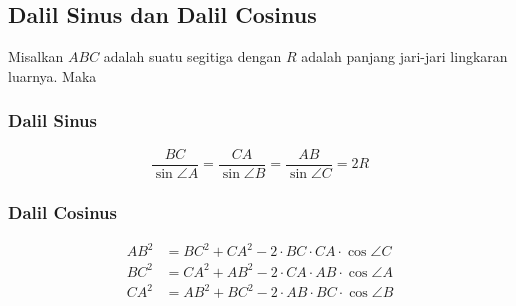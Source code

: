 \subsection{Dalil Sinus dan Dalil Cosinus}
    Misalkan $ABC$ adalah suatu segitiga dengan $R$ adalah panjang jari-jari lingkaran luarnya. Maka
    \subsubsection{Dalil Sinus}
    $$\dfrac{BC}{\sin \angle A} = \dfrac{CA}{\sin \angle B}= \dfrac{AB}{\sin \angle C} = 2R$$
    
    \subsubsection{Dalil Cosinus}
    \begin{align*}
        AB^2 &= BC^2 + CA^2 - 2\cdot BC \cdot CA \cdot \cos \angle C\\
        BC^2 &= CA^2 + AB^2 - 2\cdot CA \cdot AB \cdot \cos \angle A\\
        CA^2 &= AB^2 + BC^2 - 2\cdot AB \cdot BC \cdot \cos \angle B
    \end{align*}

